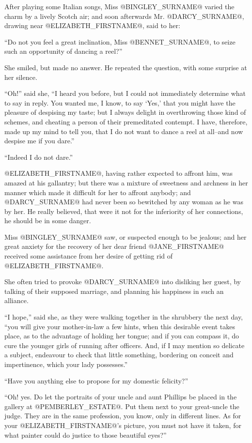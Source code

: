 After playing some Italian songs, Miss @BINGLEY_SURNAME@ varied the charm by
a lively Scotch air; and soon afterwards Mr. @DARCY_SURNAME@, drawing near
@ELIZABETH_FIRSTNAME@, said to her:

``Do not you feel a great inclination, Miss @BENNET_SURNAME@, to seize such an
opportunity of dancing a reel?''

She smiled, but made no answer. He repeated the question, with some
surprise at her silence.

``Oh!'' said she, ``I heard you before, but I could not immediately
determine what to say in reply. You wanted me, I know, to say `Yes,'
that you might have the pleasure of despising my taste; but I always
delight in overthrowing those kind of schemes, and cheating a person of
their premeditated contempt. I have, therefore, made up my mind to tell
you, that I do not want to dance a reel at all--and now despise me if
you dare.''

``Indeed I do not dare.''

@ELIZABETH_FIRSTNAME@, having rather expected to affront him, was amazed at his
gallantry; but there was a mixture of sweetness and archness in her
manner which made it difficult for her to affront anybody; and @DARCY_SURNAME@
had never been so bewitched by any woman as he was by her. He really
believed, that were it not for the inferiority of her connections, he
should be in some danger.

Miss @BINGLEY_SURNAME@ saw, or suspected enough to be jealous; and her great
anxiety for the recovery of her dear friend @JANE_FIRSTNAME@ received some
assistance from her desire of getting rid of @ELIZABETH_FIRSTNAME@.

She often tried to provoke @DARCY_SURNAME@ into disliking her guest, by talking of
their supposed marriage, and planning his happiness in such an alliance.

``I hope,'' said she, as they were walking together in the shrubbery
the next day, ``you will give your mother-in-law a few hints, when this
desirable event takes place, as to the advantage of holding her tongue;
and if you can compass it, do cure the younger girls of running after
officers. And, if I may mention so delicate a subject, endeavour to
check that little something, bordering on conceit and impertinence,
which your lady possesses.''

``Have you anything else to propose for my domestic felicity?''

``Oh! yes. Do let the portraits of your uncle and aunt Phillips be placed
in the gallery at @PEMBERLEY_ESTATE@. Put them next to your great-uncle the
judge. They are in the same profession, you know, only in different
lines. As for your @ELIZABETH_FIRSTNAME@'s picture, you must not have it taken, for
what painter could do justice to those beautiful eyes?''

